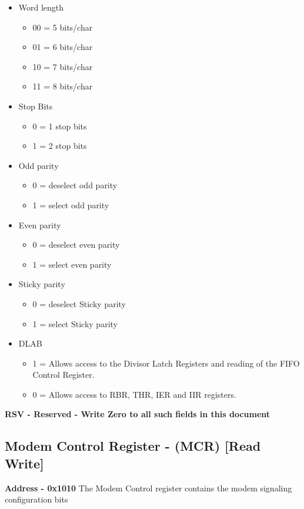 \documentclass[12pt,a4paper]{report}
\begin{document}
\begin{itemize}
\item Word length 
\begin{itemize}
\item 00 = 5 bits/char
\item 01 = 6 bits/char
\item 10 = 7 bits/char 
\item 11 = 8 bits/char
\end{itemize}
\item Stop Bits 
\begin{itemize}
\item 0 = 1 stop  bits
\item 1 = 2 stop bits
\end{itemize}
\item  Odd parity
\begin{itemize}
\item 0 = deselect odd parity
\item 1 = select odd parity
\end{itemize}
\item  Even parity
\begin{itemize}
\item 0 = deselect even parity
\item 1 = select even parity
\end{itemize}
\item  Sticky parity
\begin{itemize}
\item 0 = deselect Sticky parity
\item 1 = select Sticky parity
\end{itemize}

\item DLAB
\begin{itemize}
\item 1 = Allows access to the Divisor Latch Registers and reading of the FIFO Control Register.
\item 0 = Allows access to RBR, THR, IER and IIR registers.
\end{itemize}

\end{itemize}

\textbf{ RSV - Reserved - Write Zero to all such fields in this document}


\subsection{Modem Control Register - (MCR)  [Read Write] }
\hspace{1.6cm}
\textbf{Address - 0x1010}
The Modem Control register contains the modem signaling configuration bits
\end{document}
